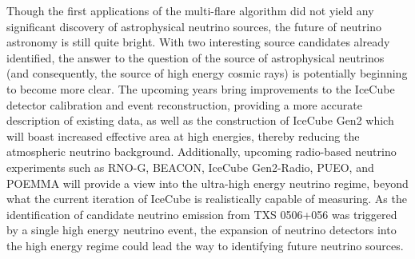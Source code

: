 Though the first applications of the multi-flare algorithm did not yield any significant discovery of astrophysical neutrino sources, the future of neutrino astronomy is still quite bright. With two interesting source candidates already identified, the answer to the question of the source of astrophysical neutrinos (and consequently, the source of high energy cosmic rays) is potentially beginning to become more clear. The upcoming years bring improvements to the IceCube detector calibration and event reconstruction, providing a more accurate description of existing data, as well as the construction of IceCube Gen2 which will boast increased effective area at high energies, thereby reducing the atmospheric neutrino background. Additionally, upcoming radio-based neutrino experiments such as RNO-G, BEACON, IceCube Gen2-Radio, PUEO, and POEMMA will provide a view into the ultra-high energy neutrino regime, beyond what the current iteration of IceCube is realistically capable of measuring. As the identification of candidate neutrino emission from TXS 0506+056 was triggered by a single high energy neutrino event, the expansion of neutrino detectors into the high energy regime could lead the way to identifying future neutrino sources. 


